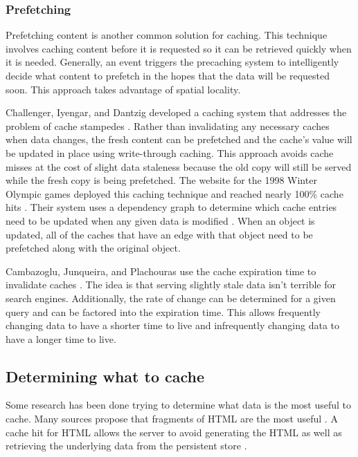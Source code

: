 \documentclass[12pt]{ucthesis}
\begin{document}
\subsubsection{Prefetching}
Prefetching content is another common solution for caching.
This technique involves caching content before it is requested so it can be retrieved quickly when it is needed.
Generally, an event triggers the precaching system to intelligently decide what content to prefetch in the hopes that the data will be requested soon.
This approach takes advantage of spatial locality.

Challenger, Iyengar, and Dantzig developed a caching system that addresses the problem of cache stampedes \cite{scalableConsistentCaching}.
Rather than invalidating any necessary caches when data changes, the fresh content can be prefetched and the cache's value will be updated in place using write-through caching.
This approach avoids cache misses at the cost of slight data staleness because the old copy will still be served while the fresh copy is being prefetched.
The website for the 1998 Winter Olympic games deployed this caching technique and reached nearly 100\% cache hits \cite{scalableConsistentCaching}.
Their system uses a dependency graph to determine which cache entries need to be updated when any given data is modified  \cite{scalableConsistentCaching}.
When an object is updated, all of the caches that have an edge with that object need to be prefetched along with the original object.

Cambazoglu, Junqueira, and Plachouras use the cache expiration time to invalidate caches \cite{refreshingPerspectiveSearch}.
The idea is that serving slightly stale data isn't terrible for search engines.
Additionally, the rate of change can be determined for a given query and can be factored into the expiration time.
This allows frequently changing data to have a shorter time to live and infrequently changing data to have a longer time to live.

\subsection{Determining what to cache}
Some research has been done trying to determine what data is the most useful to cache.
Many sources propose that fragments of HTML are the most useful \cite{comparisonOfCachingSolutions, scalableConsistentCaching}.
A cache hit for HTML allows the server to avoid generating the HTML as well as retrieving the underlying data from the persistent store \cite{howBasecampGotSoFast}.
\end{document}
